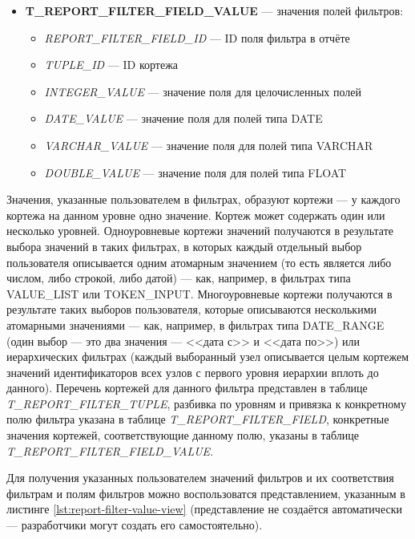 \documentclass[../user-manual.tex]{subfiles}
\begin{document}
\begin{itemize}
		\item \textbf{T\_REPORT\_FILTER\_FIELD\_VALUE}  --- значения полей фильтров:
			\begin{itemize}
			\item \textit{REPORT\_FILTER\_FIELD\_ID} --- ID поля фильтра в отчёте
			\item \textit{TUPLE\_ID} --- ID кортежа
			\item \textit{INTEGER\_VALUE} --- значение поля для целочисленных полей
			\item \textit{DATE\_VALUE} --- значение поля для полей типа DATE
			\item \textit{VARCHAR\_VALUE} --- значение поля для полей типа VARCHAR
			\item \textit{DOUBLE\_VALUE} --- значение поля для полей типа FLOAT
		\end{itemize}
		
	\end{itemize}

	Значения, указанные пользователем в фильтрах, образуют кортежи --- у каждого кортежа на данном уровне одно значение. Кортеж может содержать один или несколько уровней. Одноуровневые кортежи значений получаются в результате выбора значений в таких фильтрах, в которых каждый отдельный выбор пользователя описывается одним атомарным значением (то есть является либо числом, либо строкой, либо датой) --- как, например, в фильтрах типа VALUE\_LIST или TOKEN\_INPUT. Многоуровневые кортежи получаются в результате таких выборов пользователя, которые описываются несколькими атомарными значениями --- как, например, в фильтрах типа DATE\_RANGE (один выбор --- это два значения --- <<дата с>> и <<дата по>>) или иерархических фильтрах (каждый выборанный узел описывается целым кортежем значений идентификаторов всех узлов с первого уровня иерархии вплоть до данного). Перечень кортежей для данного фильтра представлен в таблице \textit{T\_REPORT\_FILTER\_TUPLE}, разбивка по уровням и привязка к конкретному полю фильтра указана в таблице \textit{T\_REPORT\_FILTER\_FIELD}, конкретные значения кортежей, соответствующие данному полю, указаны в таблице \textit{T\_REPORT\_FILTER\_FIELD\_VALUE}.
	
	Для получения указанных пользователем значений фильтров и их соответствия фильтрам и полям фильтров можно воспользоватся представлением, указанным в листинге \ref{lst:report-filter-value-view} (представление не создаётся автоматически --- разработчики могут создать его самостоятельно).
	
\end{document}
